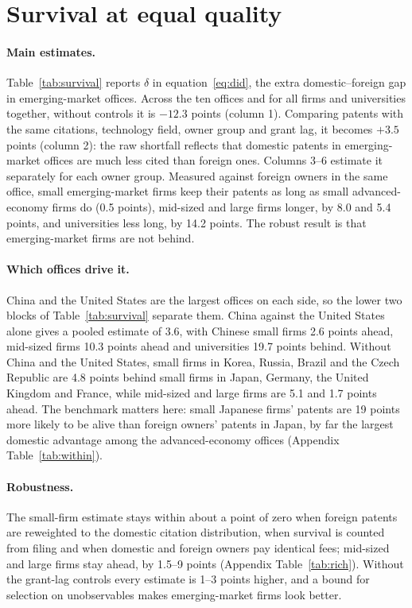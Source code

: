 \section{Survival at equal quality}\label{sec:survival}

\paragraph{Main estimates.} Table~\ref{tab:survival} reports $\delta$ in equation~\eqref{eq:did}, the extra
domestic--foreign gap in emerging-market offices. Across the ten offices and for all firms and universities together,
without controls it is $-12.3$ points (column 1). Comparing patents with the same citations, technology field, owner
group and grant lag, it becomes $+3.5$ points (column 2): the raw shortfall reflects that domestic patents in emerging-market
offices are much less cited than foreign ones. Columns 3--6 estimate it separately for each owner group. Measured
against foreign owners in the same office, small emerging-market firms keep their patents as long as small
advanced-economy firms do (0.5 points), mid-sized and large firms longer, by 8.0 and 5.4 points, and universities
less long, by 14.2 points.
The robust result is that emerging-market firms are not behind.



\paragraph{Which offices drive it.} China and the United States are the largest offices on each side, so the lower
two blocks of Table~\ref{tab:survival} separate them. China against the United States alone gives a pooled estimate of
3.6, with Chinese small firms 2.6 points ahead, mid-sized firms 10.3 points ahead and universities 19.7 points behind.
Without China and the United States, small firms in Korea, Russia, Brazil and the Czech Republic are 4.8 points behind
small firms in Japan, Germany, the United Kingdom and France, while mid-sized and large firms are 5.1 and 1.7 points
ahead. The benchmark matters here: small Japanese firms' patents are 19 points more likely to be alive than foreign
owners' patents in Japan, by far the largest domestic advantage among the advanced-economy offices (Appendix Table~\ref{tab:within}).

\paragraph{Robustness.} The small-firm estimate stays within about a point of zero when foreign patents are reweighted
to the domestic citation distribution, when survival is counted from filing and when domestic and foreign owners pay
identical fees; mid-sized and large firms stay ahead, by 1.5--9 points (Appendix Table~\ref{tab:rich}). Without the
grant-lag controls every estimate is 1--3 points higher, and a bound for selection on unobservables makes
emerging-market firms look better.

